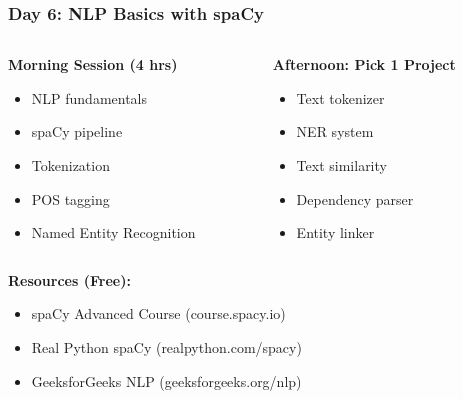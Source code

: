 \begin{frame}[fragile]\frametitle{Day 6: NLP Basics with spaCy}
\begin{columns}
    \begin{column}[T]{0.5\linewidth}
      \textbf{Morning Session (4 hrs)}
      \begin{itemize}
        \item NLP fundamentals
        \item spaCy pipeline
        \item Tokenization
        \item POS tagging
        \item Named Entity Recognition
      \end{itemize}
    \end{column}
    \begin{column}[T]{0.5\linewidth}
      \textbf{Afternoon: Pick 1 Project}
      \begin{itemize}
        \item Text tokenizer
        \item NER system
        \item Text similarity
        \item Dependency parser
        \item Entity linker
      \end{itemize}
    \end{column}
  \end{columns}
  
  \vspace{0.3cm}
  \textbf{Resources (Free):}
  \begin{itemize}
    \item spaCy Advanced Course (course.spacy.io)
    \item Real Python spaCy (realpython.com/spacy)
    \item GeeksforGeeks NLP (geeksforgeeks.org/nlp)
  \end{itemize}
\end{frame}

